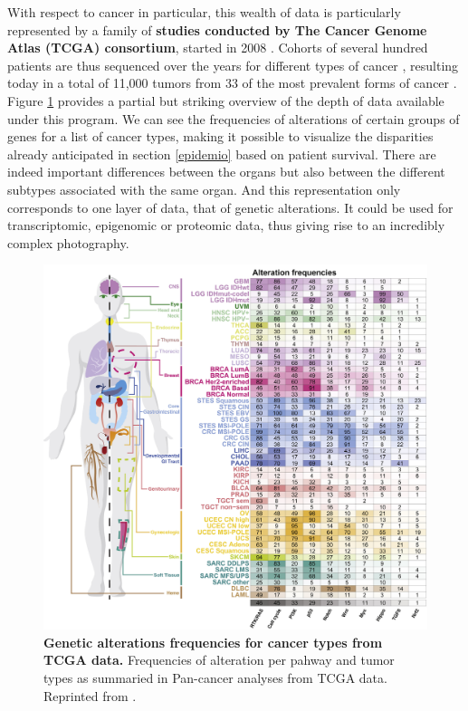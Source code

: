 \documentclass[a4paper,12pt,twoside,onecolumn,openright,final,oldfontcommands]{memoir}
\begin{document}
With respect to cancer in particular, this wealth of data is
particularly represented by a family of \textbf{studies conducted by The
Cancer Genome Atlas (TCGA) consortium}, started in 2008
\citep{cancer2008comprehensive}. Cohorts of several hundred patients are
thus sequenced over the years for different types of cancer
\citep{cancer2012comprehensive}, resulting today in a total of 11,000
tumors from 33 of the most prevalent forms of cancer
\citep{ding2018perspective}. Figure \ref{fig:tcga} provides a partial
but striking overview of the depth of data available under this program.
We can see the frequencies of alterations of certain groups of genes for
a list of cancer types, making it possible to visualize the disparities
already anticipated in section \ref{epidemio} based on patient survival.
There are indeed important differences between the organs but also
between the different subtypes associated with the same organ. And this
representation only corresponds to one layer of data, that of genetic
alterations. It could be used for transcriptomic, epigenomic or
proteomic data, thus giving rise to an incredibly complex photography.

\begin{figure}

{\centering \includegraphics[width=0.9\linewidth]{fig/tcga} 

}

\caption[Genetic alterations frequencies for cancer types from TCGA data]{\textbf{Genetic alterations frequencies for cancer
types from TCGA data.} Frequencies of alteration per pahway and tumor
types as summaried in Pan-cancer analyses from TCGA data. Reprinted from
\citet{sanchez2018oncogenic}.}\label{fig:tcga}
\end{figure}
\end{document}
